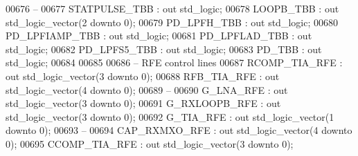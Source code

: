 \begin{DoxyCode}
00676 \textcolor{keyword}{        --}
00677         STATPULSE\_TBB       : \textcolor{keywordflow}{out} \textcolor{comment}{std\_logic};
00678         LOOPB\_TBB               : \textcolor{keywordflow}{out} \textcolor{comment}{std\_logic\_vector}(\textcolor{vhdllogic}{}\textcolor{vhdllogic}{2} \textcolor{keywordflow}{downto} \textcolor{vhdllogic}{}\textcolor{vhdllogic}{0});
00679         PD\_LPFH\_TBB         : \textcolor{keywordflow}{out} \textcolor{comment}{std\_logic};
00680         PD\_LPFIAMP\_TBB  : \textcolor{keywordflow}{out} \textcolor{comment}{std\_logic};
00681         PD\_LPFLAD\_TBB       : \textcolor{keywordflow}{out} \textcolor{comment}{std\_logic};
00682         PD\_LPFS5\_TBB        : \textcolor{keywordflow}{out} \textcolor{comment}{std\_logic};
00683         PD\_TBB                  : \textcolor{keywordflow}{out} \textcolor{comment}{std\_logic};
00684 
00685 
00686 \textcolor{keyword}{        -- RFE control lines}
00687         RCOMP\_TIA\_RFE   : \textcolor{keywordflow}{out} \textcolor{comment}{std\_logic\_vector}(\textcolor{vhdllogic}{}\textcolor{vhdllogic}{3} \textcolor{keywordflow}{downto} \textcolor{vhdllogic}{}\textcolor{vhdllogic}{0});
00688         RFB\_TIA\_RFE : \textcolor{keywordflow}{out} \textcolor{comment}{std\_logic\_vector}(\textcolor{vhdllogic}{}\textcolor{vhdllogic}{4} \textcolor{keywordflow}{downto} \textcolor{vhdllogic}{}\textcolor{vhdllogic}{0});
00689 \textcolor{keyword}{        --}
00690         G\_LNA\_RFE           : \textcolor{keywordflow}{out} \textcolor{comment}{std\_logic\_vector}(\textcolor{vhdllogic}{}\textcolor{vhdllogic}{3} \textcolor{keywordflow}{downto} \textcolor{vhdllogic}{}\textcolor{vhdllogic}{0});
00691         G\_RXLOOPB\_RFE   : \textcolor{keywordflow}{out} \textcolor{comment}{std\_logic\_vector}(\textcolor{vhdllogic}{}\textcolor{vhdllogic}{3} \textcolor{keywordflow}{downto} \textcolor{vhdllogic}{}\textcolor{vhdllogic}{0});
00692         G\_TIA\_RFE           : \textcolor{keywordflow}{out} \textcolor{comment}{std\_logic\_vector}(\textcolor{vhdllogic}{}\textcolor{vhdllogic}{1} \textcolor{keywordflow}{downto} \textcolor{vhdllogic}{}\textcolor{vhdllogic}{0});
00693 \textcolor{keyword}{        --}
00694         CAP\_RXMXO\_RFE   : \textcolor{keywordflow}{out} \textcolor{comment}{std\_logic\_vector}(\textcolor{vhdllogic}{}\textcolor{vhdllogic}{4} \textcolor{keywordflow}{downto} \textcolor{vhdllogic}{}\textcolor{vhdllogic}{0});
00695         CCOMP\_TIA\_RFE   : \textcolor{keywordflow}{out} \textcolor{comment}{std\_logic\_vector}(\textcolor{vhdllogic}{}\textcolor{vhdllogic}{3} \textcolor{keywordflow}{downto} \textcolor{vhdllogic}{}\textcolor{vhdllogic}{0});

\end{DoxyCode}
